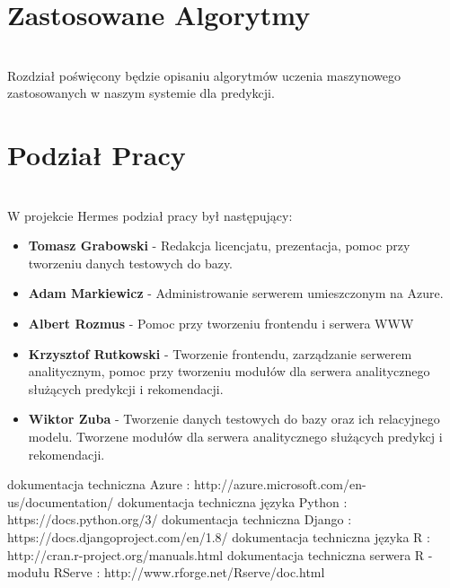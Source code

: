 \documentclass[licencjacka]{pracamgr}
\begin{document}
\chapter{Zastosowane Algorytmy}
~\\ \indent Rozdział poświęcony będzie opisaniu algorytmów uczenia maszynowego zastosowanych w naszym systemie dla predykcji.

\chapter{Podział Pracy}
~\\ \indent W projekcie Hermes podział pracy był następujący:

\begin{itemize}
\item \textbf{Tomasz Grabowski} - Redakcja licencjatu, prezentacja, pomoc przy tworzeniu danych testowych do bazy.
\item \textbf{Adam Markiewicz} - Administrowanie serwerem umieszczonym na Azure.
\item \textbf{Albert Rozmus} - Pomoc przy tworzeniu frontendu i serwera WWW
\item \textbf{Krzysztof Rutkowski} - Tworzenie frontendu, zarządzanie serwerem analitycznym, pomoc przy tworzeniu modułów dla serwera analitycznego służących predykcji i rekomendacji.
\item \textbf{Wiktor Zuba} - Tworzenie danych testowych do bazy oraz ich relacyjnego modelu. Tworzene modułów dla serwera analitycznego służących predykcj i rekomendacji.
\end{itemize}


\begin{thebibliography}{99}
dokumentacja techniczna Azure :
http://azure.microsoft.com/en-us/documentation/
dokumentacja techniczna języka Python : 
https://docs.python.org/3/
dokumentacja techniczna Django : 
https://docs.djangoproject.com/en/1.8/
dokumentacja techniczna języka R :
http://cran.r-project.org/manuals.html
dokumentacja techniczna serwera R - modułu RServe :
http://www.rforge.net/Rserve/doc.html
\end{thebibliography}
\end{document}
